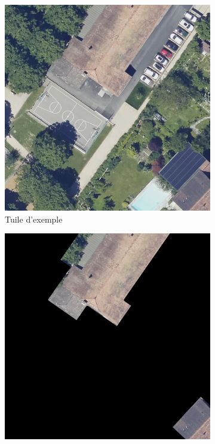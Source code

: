 \begin{figure}[H]
    \centering
    \begin{subfigure}[b]{0.49\textwidth}
        \centering
        \includegraphics[width=\textwidth]{02-main/figures/ch3/ch3_postprocessing_dataset_01_exemple_dataset.png}
        \caption{Tuile d'exemple}
        \label{fig:ch3_postprocessing_dataset_01_exemple_dataset}
    \end{subfigure}
    \hfill
    \begin{subfigure}[b]{0.49\textwidth}
        \centering
        \includegraphics[width=\textwidth]{02-main/figures/ch3/ch3_postprocessing_dataset_02_exemple_postraitement.png}

\end{subfigure}
\end{figure}
